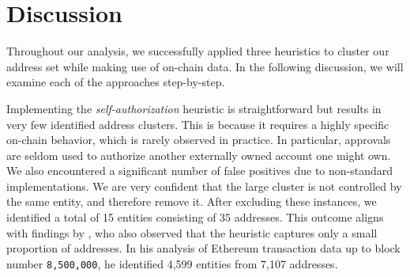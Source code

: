 \documentclass[12pt,a4paper,titlepage,oneside,english]{article}
\begin{document}

\section{Discussion}
Throughout our analysis, we successfully applied three heuristics to cluster our address set while making use of on-chain data. In the following discussion, we will examine each of the approaches step-by-step.

Implementing the \textit{self-authorization} heuristic is straightforward but results in very few identified address clusters. This is because it requires a highly specific on-chain behavior, which is rarely observed in practice. In particular, approvals are seldom used to authorize another externally owned account one might own. We also encountered a significant number of false positives due to non-standard implementations. We are very confident that the large cluster is not controlled by the same entity, and therefore remove it. After excluding these instances, we identified a total of 15 entities consisting of 35 addresses. This outcome aligns with findings by \cite{FV:17}, who also observed that the heuristic captures only a small proportion of addresses. In his analysis of Ethereum transaction data up to block number \texttt{8,500,000}, he identified 4,599 entities from 7,107 addresses.
\end{document}
